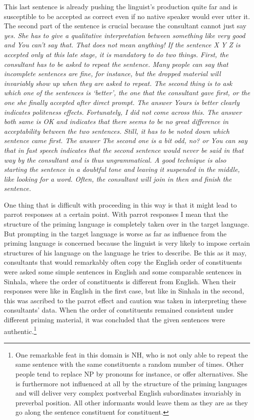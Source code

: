 This last sentence is already pushing the linguist's production quite far and is susceptible to be accepted as correct even if no native speaker would ever utter it.
The second part of the sentence is crucial because the consultant cannot just say \em yes\em. She has to give a qualitative interpretation between something like \em very good \em and \em You can't say that. That does not mean anything! \em If the sentence X Y Z is accepted only at this late stage, it is mandatory to do two things. First, the consultant has to be asked to repeat the sentence. Many people can say that incomplete sentences are fine, for instance, but the dropped material will invariably show up when they are asked to repeat. The second thing is to ask which one of the sentences is `better', the one that the consultant gave first, or the one she finally accepted after direct prompt. The answer \em Yours is better \em clearly indicates politeness effects. Fortunately, I did not come across this. The answer \em both same \em is OK and indicates that there seems to be no great difference in acceptability between the two sentences. Still, it has to be noted down which sentence came first. The answer \em The second one is a bit odd, no? \em or \em You can say that in fast speech \em indicates that the second sentence would never be said in that way by the consultant and is thus ungrammatical.
A good technique is also starting the sentence in a doubtful tone and leaving it suspended in the middle, like looking for a word. Often, the consultant will join in then and finish the sentence.

One thing that is difficult with proceeding in this way is that it might lead to parrot responses at a certain point. With parrot responses I mean that the structure of the priming language is completely taken over in the target language. But prompting in the target language is worse as far as influence from the priming language is concerned because the linguist is very likely to impose certain structures of his language on the language he tries to describe. Be this as it may, consultants that would remarkably often copy the English order of constituents were asked some simple sentences in English and some comparable sentences in Sinhala, where the order of constituents is different from English. When their responses were like in English in the first case, but like in Sinhala in the second, this was ascribed to the parrot effect and caution was taken in interpreting these consultants' data. When the order of constituents remained consistent under different priming material, it was concluded that the given sentences were authentic.\footnote{
One remarkable feat in this domain is NH, who is not only able to repeat the same sentence with the same constituents a random number of times. Other people tend to replace NP by pronouns for instance, or offer alternatives. She is furthermore not influenced at all by the structure of the priming languages and will deliver very complex postverbal English subordinates invariably in preverbal position. All other informants would leave them as they are as they go along the sentence constituent for constituent.}

